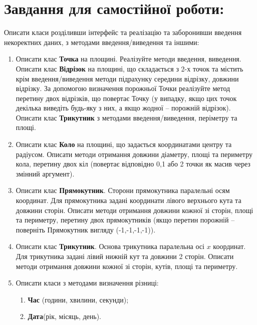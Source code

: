 \documentclass[a5paper,titlepage,openany,twoside,draft]{book_unv}%
\makeatletter
\newcommand{\xslalph}[1]{\expandafter\@xslalph\csname c@#1\endcsname}
\newcommand{\@xslalph}[1]{%
    \ifcase#1\or а\or б\or в\or г\or д\or e\or є\or ж\or з\or i%
    \or й\or к\or л\or м\or н\or о\or п\or р\or с\or т%
    \or у\or ф\or х\or ц\or ч\or ш\or ю\or я\or аа\or бб\or вв%
    \else\@ctrerr\fi%
}
\makeatother
\begin{document}
\section{Завдання для самостійної роботи:}

Описати класи розділивши інтерфейс та реалізацію та заборонивши введення
некоректних даних, з методами введення/виведення та іншими:

\begin{enumerate}
\def\labelenumi{\arabic{enumi})}
\setcounter{enumi}{3}
\item
  Описати клас \textbf{Точка} на площині. Реалізуйте методи введення,
  виведення. Описати клас \textbf{Відрізок} на площині, що складається
  з 2-х точок та містить крім введення/виведення методи підрахунку
  середини відрізку, довжини відрізку. За допомогою визначення
  порожньої Точки реалізуйте метод перетину двох відрізків, що повертає
  Точку (у випадку, якщо цих точок декілька виведіть будь-яку з них, а
  якщо жодної -- порожній відрізок). Описати клас \textbf{Трикутник} з 
  методами введення/виведення, періметру та площі.
 

\item
  Описати клас \textbf{Коло} на площині, що задається координатами
  центру та радіусом. Описати методи отримання довжини діаметру, площі
  та периметру кола, перетину двох кіл (повертає відповідно 0,1 або 2
  точки як масив через змінний аргумент).

\item
  Описати клас \textbf{Прямокутник}. Сторони прямокутника паралельні
  осям координат. Для прямокутника задані координати лівого верхнього
  кута та довжини сторін. Описати методи отримання довжини кожної зі
  сторін, площі та периметру, перетину двох прямокутників (якщо перетин
  порожній -- поверніть Прямокутник вигляду (-1,-1,-1,-1)).
\item
  Описати клас \textbf{Трикутник}. Основа трикутника паралельна осі
  $x$ координат. Для трикутника задані лівий нижній кут та довжини
  2 сторін. Описати методи отримання довжини кожної зі сторін, кутів,
  площі та периметру.

\item
  Описати класи з методами визначення різниці:
\begin{enumerate}[label=\xslalph*)]
\item \textbf{Час} (години, хвилини, секунди);
\item \textbf{Дата}(рік, місяць, день).
\end{enumerate}


\end{enumerate}
\end{document}
